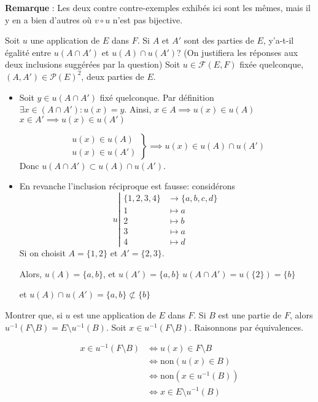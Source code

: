 \documentclass{article}
\renewenvironment{question_kholle}[2][ ]
{
	\subsection{\texorpdfstring{#2}{}}
	\notblank{#1}
	{
		\noindent #1
		\bigbreak
	}
	{}
	\begin{proof}
}
{
	\end{proof}
}
\begin{document}
\textbf{Remarque} : Les deux contre contre-exemples exhibés ici sont les mêmes, mais il y en a bien d'autres où $v \circ u$ n'est pas bijective.

\begin{question_kholle}{Soit $u$ une application de $E$ dans $F$. Si $A$ et $A'$ sont des parties de $E$, y'a-t-il égalité entre $u(A \cap A')$ et $u(A) \cap u(A')$? (On justifiera les réponses aux deux inclusions suggérées par la question)}
    Soit $u \in \mathcal{F}(E, F)$ fixée quelconque, $(A, A') \in \mathcal{P}(E)^{2}$, deux parties de $E$.
    \begin{itemize}[label=$\lozenge$]
        \item Soit $y \in u(A \cap A')$ fixé quelconque.
        Par définition $\exists x \in (A \cap A') : u(x) = y$.
        Ainsi, $x \in A \implies u(x) \in u(A)$
        $x \in A' \implies u(x) \in u(A')$
        
        $$
        \left.
        \begin{array}{ll}
            u(x) \in u(A) \\
            u(x) \in u(A')
        \end{array}\right\} \implies u(x) \in u(A) \cap u(A')
        $$
        Donc $u(A \cap A') \subset u(A) \cap u(A')$.
        
        \item En revanche l'inclusion réciproque est fausse: considérons
        $$
        u \left|\begin{array}{ll} \{ 1, 2, 3, 4 \} &\to \{ a, b, c, d \} \\ 1 &\mapsto a \\
            2  & \mapsto b  \\
            3  & \mapsto a \\
            4  & \mapsto d\end{array}\right.
            $$
            Si on choisit $A = \{ 1, 2 \}$ et $A' = \{ 2, 3 \}$.
            
            Alors, $u(A) = \{ a, b \}$, et $u(A') = \{ a, b \}$
            $u(A \cap A') = u(\{ 2 \}) = \{ b \}$
            
            et $u(A) \cap u(A') = \{ a, b \} \not\subset \{  b \}$
        \end{itemize}
    \end{question_kholle}
    \begin{question_kholle}{Montrer que, si $u$ est une application de $E$ dans $F$. Si $B$ est une partie de $F$, alors $u^{-1}(F\setminus B) = E \setminus u^{-1}(B)$.}
        Soit $x \in u^{-1}(F\setminus B)$. Raisonnons par équivalences. 
        
        \begin{align*}
            x \in u^{-1}(F \setminus B) 
            & \iff u(x) \in F \setminus B \\
            & \iff \mathrm{non} (u(x) \in B) \\
            & \iff \mathrm{non} (x \in u^{-1}(B)) \\
            & \iff x \in E \setminus u^{-1}(B)
        \end{align*}
        
    \end{question_kholle}
\end{document}
